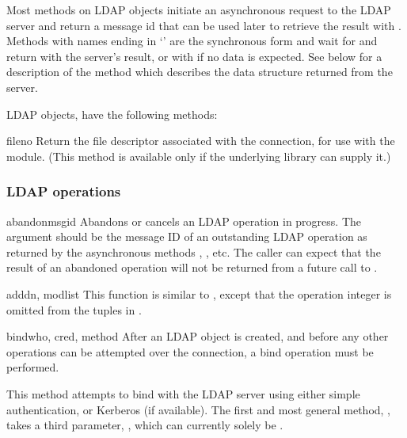 Most methods on LDAP objects
initiate an asynchronous request to the LDAP server 
and return a message id that can be used later to retrieve the result
with . 
Methods with names ending in `' are the synchronous form 
and wait for and return with the server's result, or with
 if no data is expected.
See below for a description of the  method 
which describes the data structure returned from the server.

LDAP objects, have the following methods:


\begin{methoddesc}{fileno}{}
Return the file descriptor associated with the connection, for use
with the  module.
(This method is available only if the underlying library can supply it.)
\end{methoddesc}

\subsubsection{LDAP operations}


\begin{methoddesc}[LDAP]{abandon}{msgid}
Abandons or cancels an LDAP operation in progress. The  argument
should be the message ID of an outstanding LDAP operation as returned by
the asynchronous methods , , etc. 
The caller can expect that the result
of an abandoned operation will not be returned from a future call to 
.
\end{methoddesc}


\begin{methoddesc}[LDAP]{add}{dn, modlist} %
This function is similar to , except that the operation
integer is omitted from the tuples in .
\end{methoddesc}


\begin{methoddesc}[LDAP]{bind}{who, cred, method} %
After an LDAP object is created, and before any other operations can be
attempted over the connection, a bind operation must be performed.

This method attempts to bind with the LDAP server using 
either simple authentication, or Kerberos (if available).
The first and most general method, ,
takes a third parameter, , which can currently solely
be .
\end{methoddesc}

